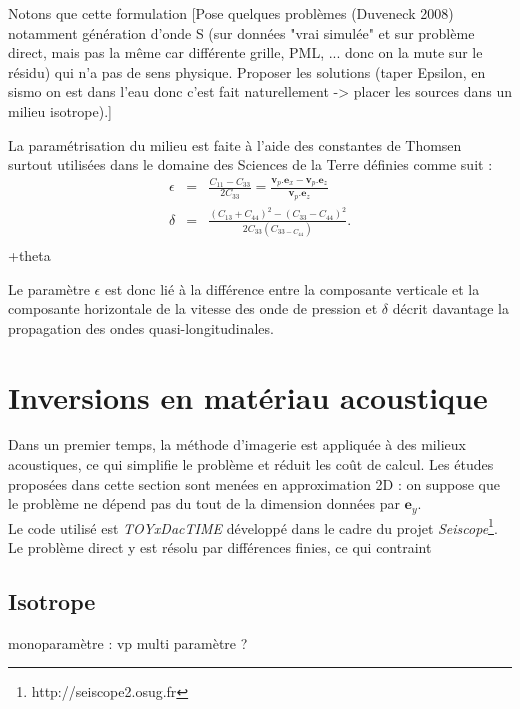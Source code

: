 Notons que cette formulation [Pose quelques problèmes (Duveneck 2008) notamment génération d'onde S (sur données "vrai simulée"  et sur problème direct, mais pas la même car différente grille, PML, ... donc on la mute sur le résidu) qui n'a pas de sens physique. Proposer les solutions (taper Epsilon, en sismo on est dans l'eau donc c'est fait naturellement -> placer les sources dans un milieu isotrope).]
 

La paramétrisation du milieu est faite à l'aide des constantes de Thomsen~\citep{thomsen} surtout utilisées dans le domaine des Sciences de la Terre définies comme suit : 
\begin{eqnarray}
	\epsilon & =  & \frac{C_{11}-C_{33}}{2C_{33}} = \frac{\bm{v}_{p}.\bm{e}_{x} -  \bm{v}_{p}.\bm{e}_{z}}{\bm{v}_{p}.\bm{e}_{z}}\\
	\delta & = & \frac{(C_{13}+C_{44})^2-(C_{33}-C_{44})^2}{2C_{33}(C_{33-C_{44}})}\text{.}\\
\end{eqnarray}
+theta

Le paramètre $\epsilon$ est donc lié à la différence entre la composante verticale et la composante horizontale de la vitesse des onde de pression et $\delta$ décrit davantage la propagation des ondes quasi-longitudinales.



\section{Inversions en matériau acoustique }

Dans un premier temps, la méthode d'imagerie est appliquée à des milieux acoustiques, ce qui simplifie le problème et réduit les coût de calcul. Les études proposées dans cette section sont menées en approximation 2D : on suppose que le problème ne dépend pas du tout de la dimension données par $\bm{e}_{y}$.\\

Le code utilisé est \emph{TOYxDacTIME} développé dans le cadre du projet \emph{Seiscope}\footnote{http://seiscope2.osug.fr}. Le problème direct y est résolu par différences finies, ce qui contraint 

\subsection{Isotrope}




monoparamètre : vp
multi paramètre ?



